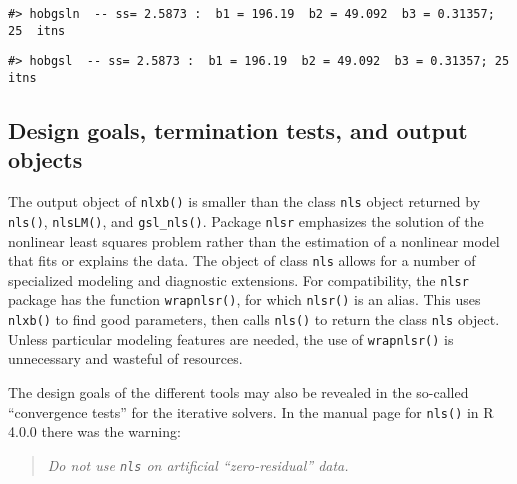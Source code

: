 \begin{verbatim}
#> hobgsln  -- ss= 2.5873 :  b1 = 196.19  b2 = 49.092  b3 = 0.31357; 25  itns
\end{verbatim}

\begin{verbatim}
#> hobgsl  -- ss= 2.5873 :  b1 = 196.19  b2 = 49.092  b3 = 0.31357; 25  itns
\end{verbatim}

\hypertarget{design-goals-termination-tests-and-output-objects}{%
\subsection{Design goals, termination tests, and output objects}\label{design-goals-termination-tests-and-output-objects}}

The output object of \texttt{nlxb()} is smaller than the class \texttt{nls} object returned
by \texttt{nls()}, \texttt{nlsLM()}, and \texttt{gsl\_nls()}. Package \texttt{nlsr} emphasizes the solution
of the nonlinear least squares problem rather than the estimation of a nonlinear
model that fits or explains the data. The object of class \texttt{nls} allows for
a number of specialized modeling and diagnostic extensions. For compatibility,
the \texttt{nlsr} package has the function \texttt{wrapnlsr()}, for which \texttt{nlsr()} is an alias.
This uses \texttt{nlxb()} to find good parameters, then calls \texttt{nls()} to return the class
\texttt{nls} object. Unless particular modeling features are needed, the use of
\texttt{wrapnlsr()} is unnecessary and wasteful of resources.

The design goals of the different tools may also be revealed in the so-called
``convergence tests'' for the iterative solvers. In the manual page for \texttt{nls()}
in R 4.0.0 there was the warning:

\begin{quote}
\emph{Do not use \texttt{nls} on artificial ``zero-residual'' data.}
\end{quote}


